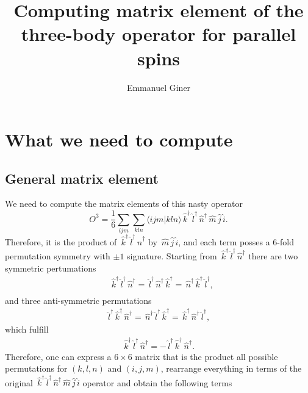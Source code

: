 \documentclass[aip,jcp,reprint,noshowkeys,superscriptaddress]{revtex4-1}
\newcommand{\overlap}[2]{\langle #1 | #2 \rangle}
\newcommand{\opr}[1]{\,\hat{#1}}
\newcommand{\oprd}[1]{\,\hat{#1}^\dagger}
\begin{document}
	

\title{Computing matrix element of the three-body operator for parallel spins}

\author{Emmanuel Giner}

\maketitle
\section{What we need to compute}
\subsection{General matrix element}
We need to compute the matrix elements of this nasty operator
\begin{equation}
 O^3 = \frac{1}{6} \sum_{ijm} \sum_{kln} \overlap{ijm}{kln} \oprd{k} \oprd{l} \oprd{n}  \opr{m} \opr{j} \opr{i}.
\end{equation}
Therefore, it is the product of $\oprd{k} \oprd{l} \oprd{n}$ by $\opr{m} \opr{j} \opr{i}$, and each term posses a 6-fold permutation symmetry with $\pm 1$ signature. 
Starting from $\oprd{k} \oprd{l} \oprd{n}$ there are two symmetric pertumations 
\begin{equation}
 \begin{aligned}
   & \oprd{k} \oprd{l} \oprd{n} = \oprd{l} \oprd{n} \oprd{k} = \oprd{n} \oprd{k} \oprd{l}, \\
 \end{aligned}
\end{equation}
and three anti-symmetric permutations 
\begin{equation}
 \begin{aligned}
  \oprd{l} \oprd{k} \oprd{n}  =   \oprd{n} \oprd{l} \oprd{k} =  \oprd{k} \oprd{n} \oprd{l},
 \end{aligned}
\end{equation}
which fulfill 
\begin{equation}
 \begin{aligned}
 \oprd{k} \oprd{l} \oprd{n} = - \oprd{l} \oprd{k} \oprd{n}. 
 \end{aligned}
\end{equation}
Therefore, one can express a $6\times 6$ matrix that is the product all possible permutations for $(k,l,n)$ and $(i,j,m)$, rearrange everything in terms of the original $\oprd{k} \oprd{l} \oprd{n}  \opr{m} \opr{j} \opr{i}$ operator and obtain the following terms 
\end{document}
